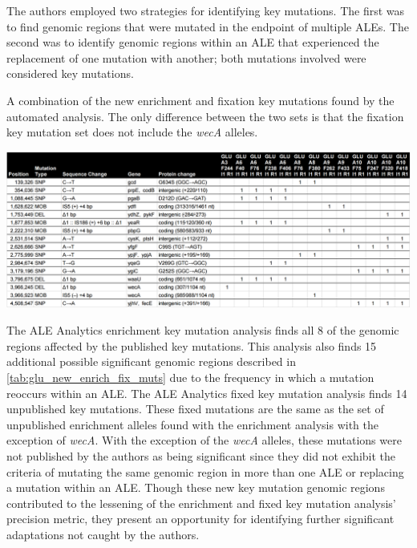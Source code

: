 \documentclass[12pt,final,masters,chapterheads]{ucsd}  %
\begin{document}
The authors employed two strategies for identifying key mutations. The first was to find genomic regions that were mutated in the endpoint of multiple ALEs.
The second was to identify genomic regions within an ALE that experienced the replacement of one mutation with another; both mutations involved were considered key mutations.
\begin{table}[H]
  \caption{A combination of the new enrichment and fixation key mutations found by the automated analysis. The only difference between the two sets is that the fixation key mutation set does not include the \textit{wecA} alleles.}
  \centering
  \includegraphics[width=\textwidth]{glu_new_enrich_fix_muts.png}
  \label{tab:glu_new_enrich_fix_muts}
\end{table}
The ALE Analytics enrichment key mutation analysis finds all 8 of the genomic regions affected by the published key mutations. This analysis also finds 15 additional possible significant genomic regions described in \ref{tab:glu_new_enrich_fix_muts} due to the frequency in which a mutation reoccurs within an ALE. The ALE Analytics fixed key mutation analysis finds 14 unpublished key mutations. These fixed mutations are the same as the set of unpublished enrichment alleles found with the enrichment analysis with the exception of \textit{wecA}. With the exception of the \textit{wecA} alleles, these mutations were not published by the authors as being significant since they did not exhibit the criteria of mutating the same genomic region in more than one ALE or replacing a mutation within an ALE. Though these new key mutation genomic regions contributed to the lessening of the enrichment and fixed key mutation analysis' precision metric, they present an opportunity for identifying further significant adaptations not caught by the authors.
\end{document}
